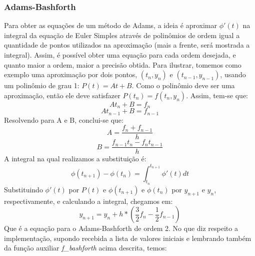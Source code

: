 \documentclass{article}
\begin{document}
\begin{otherlanguage}{brazil}
        \subsubsection{Adams-Bashforth}
                Para obter as equações de um método de Adams, a ideia é aproximar $\phi'(t)$ na integral da equação de Euler Simples através de polinômios de ordem igual a quantidade de pontos utilizados na aproximação (mais a frente, será mostrada a integral). Assim, é possível obter uma equação para cada ordem desejada, e quanto maior a ordem, maior a precisão obtida. Para ilustrar, tomemos como exemplo uma aproximação por dois pontos, $(t_n, y_n)$ e $(t_{n-1}, y_{n-1})$, usando um polinômio de grau 1: $P(t) = At + B$. Como o polinômio deve ser uma aproximação, então ele deve satisfazer $P(t_n) = f(t_n, y_n)$. Assim, tem-se que:\newline
                \begin{equation}
                    At_n + B = f_n
                \end{equation}
                \begin{equation}
                    At_{n-1} + B = f_{n-1}
                \end{equation}
                Resolvendo para A e B, conclui-se que:
                \begin{equation}
                    A = \frac{f_n + f_{n-1}}{h}
                \end{equation}
                \begin{equation}
                    B = \frac{f_{n-1}t_{n} - f_{n}t_{n-1}}{h}
                \end{equation}
                A integral na qual realizamos a substituição é:
                \begin{equation}
                    \phi(t_{n+1})-\phi(t_n) = \int_{t_n}^{t_{n+1}} \phi'(t)dt
                \end{equation}
                Substituindo $\phi'(t)$ por $P(t)$ e $\phi(t_{n+1})$ e $\phi(t_n)$ por $y_{n+1}$ e $y_n$, respectivamente, e calculando a integral, chegamos em:
                \begin{equation}
                    y_{n+1} = y_n + h * (\frac{3}{2}f_n - \frac{1}{2} f_{n-1})
                \end{equation}
                Que é a equação para o Adams-Bashforth de ordem 2. No que diz respeito a implementação, supondo recebida a lista de valores iniciais e lembrando também da função auxiliar \textit{f\_bashforth} acima descrita, temos:

\end{otherlanguage}
\end{document}
